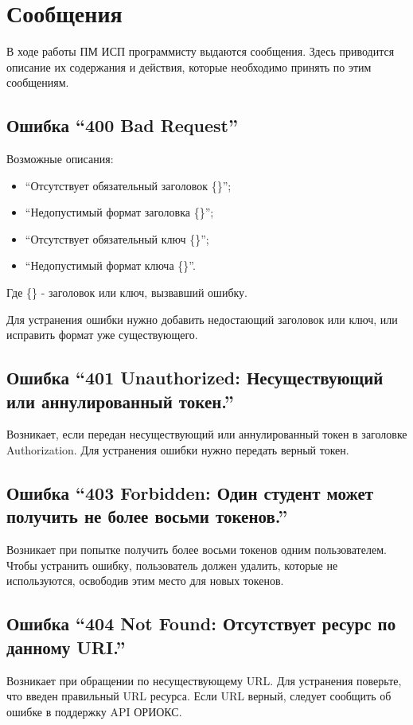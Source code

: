 \chapter{Сообщения}
\label{ch:messages}

В ходе работы ПМ ИСП программисту выдаются сообщения.
Здесь приводится описание их содержания и действия, которые необходимо принять по этим сообщениям.

\section*{Ошибка ``400 Bad Request''}
Возможные описания:
\begin{itemize}
  \item ``Отсутствует обязательный заголовок \{\}'';
  \item ``Недопустимый формат заголовка \{\}'';
  \item ``Отсутствует обязательный ключ \{\}'';
  \item ``Недопустимый формат ключа \{\}''.
\end{itemize}
Где \{\} - заголовок или ключ, вызвавший ошибку.

Для устранения ошибки нужно добавить недостающий заголовок или ключ, или исправить формат уже существующего.

\section*{Ошибка ``401 Unauthorized: Несуществующий или аннулированный токен.''}
Возникает, если передан несуществующий или аннулированный токен в заголовке Authorization.
Для устранения ошибки нужно передать верный токен.

\section*{Ошибка ``403 Forbidden: Один студент может получить не более восьми токенов.''}
Возникает при попытке получить более восьми токенов одним пользователем.
Чтобы устранить ошибку, пользователь должен удалить, которые не используются, освободив этим место для новых токенов.

\section*{Ошибка ``404 Not Found: Отсутствует ресурс по данному URI.''}
Возникает при обращении по несуществующему URL\@.
Для устранения поверьте, что введен правильный URL ресурса.
Если URL верный, следует сообщить об ошибке в поддержку API ОРИОКС\@.

